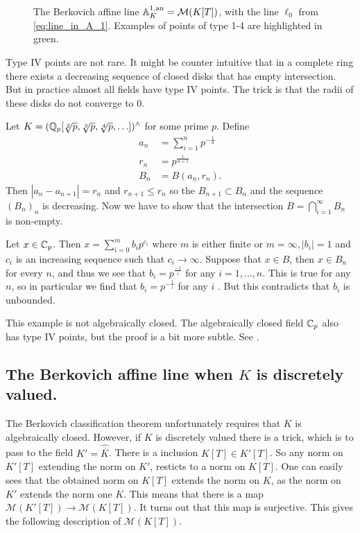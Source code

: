 \begin{figure}[h]
    \centering
	\caption{The Berkovich affine line $\mathbb{A}_K^{1, \text{an}} = \mathcal{M} (K[T])$, with the line $\ell_0$ from \cref{eq:line_in_A_1}. 
	Examples of points of type 1-4 are highlighted in green.}
	\label{fig:affine_line}
\end{figure}
Type IV points are not rare. It might be counter intuitive that in a complete ring there exists a decreasing sequence of closed disks that has empty intersection. 
But in practice almost all fields have type  IV points. 
The trick is that the radii of these disks do not converge to $0$. 
\begin{example}\label{ex:type4point}
	Let $K = (\mathbb{Q}_p[\sqrt[2]{p} ,\sqrt[3]{p}, \sqrt[4]{p},\ldots])^{\wedge}  $ for some prime $p$. 
	Define 
	\begin{align*}
		a_n &= \sum_{i = 1}^{n} p^{-\frac{1}{n}}\\
		r_n &= p^{\frac{1}{n + 1}} \\
		B_n &= B(a_n, r_n) 
.\end{align*}
Then $|a_n - a_{n + 1}| = r_n$ and $r_{n + 1} \le r_n$ so the $B_{n + 1} \subset B_n$ and the sequence $(B_n)_n$ is decreasing. 
Now we have to show that the intersection $B = \bigcap_{i = 1} ^{\infty} B_n$ is non-empty. 

Let $x \in \mathbb{C}_p$. Then $x = \sum_{i = 0}^{m} b_i p^{c_i}$ where $m$ is either finite or $m = \infty, |b_i| = 1$ and $c_i$ is an increasing sequence such that $c_i \to \infty $. Suppose that  $x \in B$, then $x \in B_n$ for every $n$, and thus we see that  $b_i = p^{\frac{-1}{i}}$ for any $i = 1, \ldots, n$.  
This is true for any $n $, so in particular we find that $b_i = p^{-\frac{1}{i}}$ for any $i$ .
But this contradicts that $b_i$ is unbounded. 

This example is not algebraically closed.  
The algebraically closed field $\mathbb{C}_p$ also has type IV points, but the proof is a bit more subtle. See \cite[][sec. 3.4]{robertCoursePadicAnalysis2000}.
\end{example}

\subsection{The Berkovich affine line when $K$ is discretely valued.} \label{sec:the_berkovich_affine_line_when_k_is_discretely_valued.}
The Berkovich classification theorem unfortunately requires that $K$ is algebraically closed. 
However, if $K$ is discretely valued there is a trick, which is to pass to the field $K' = \hat{\overline{K}}$. 
There is a inclusion $K[T] \in K'[T]$. 
So any norm on $K'[T]$ extending the norm on $K'$, resticts to a norm on $K[T]$. 
One can easily sees that the obtained norm on $K[T]$ extends the norm on  $K$, as the norm on $K'$ extends the norm one $K$. 
This means that there is a map $\mathcal{M} \left(K'[T]\right) \to \mathcal{M} (K[T])$. 
It turns out that this map is surjective. 
This gives the following description of $\mathcal{M} (K[T])$.

